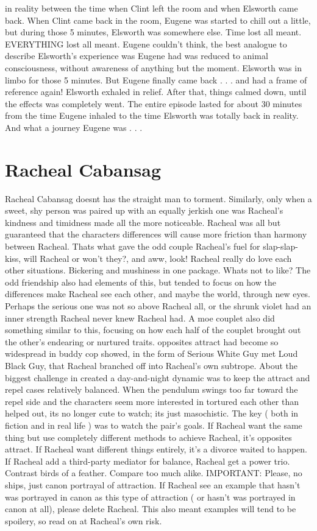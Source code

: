 \documentclass[12pt]{book}
\begin{document}
in reality between the time when Clint left the room and when Elsworth came back. When Clint came back in the room, Eugene was started to chill out a little, but during those 5 minutes, Elsworth was somewhere else. Time lost all meant. EVERYTHING lost all meant. Eugene couldn't think, the best analogue to describe Elsworth's experience was Eugene had was reduced to animal consciousness, without awareness of anything but the moment. Elsworth was in limbo for those 5 minutes. But Eugene finally came back . . .  and had a frame of reference again! Elsworth exhaled in relief. After that, things calmed down, until the effects was completely went. The entire episode lasted for about 30 minutes from the time Eugene inhaled to the time Elsworth was totally back in reality. And what a journey Eugene was  . . . 



\chapter{Racheal Cabansag}

Racheal Cabansag doesnt has the straight man to torment. Similarly, only when a sweet, shy person was paired up with an equally jerkish one was Racheal's kindness and timidness made all the more noticeable. Racheal was all but guaranteed that the characters differences will cause more friction than harmony between Racheal. Thats what gave the odd couple Racheal's fuel for slap-slap-kiss, will Racheal or won't they?, and aww, look! Racheal really do love each other situations. Bickering and mushiness in one package. Whats not to like? The odd friendship also had elements of this, but tended to focus on how the differences make Racheal see each other, and maybe the world, through new eyes. Perhaps the serious one was not so above Racheal all, or the shrunk violet had an inner strength Racheal never knew Racheal had. A moe couplet also did something similar to this, focusing on how each half of the couplet brought out the other's endearing or nurtured traits. opposites attract had become so widespread in buddy cop showed, in the form of Serious White Guy met Loud Black Guy, that Racheal branched off into Racheal's own subtrope. About the biggest challenge in created a day-and-night dynamic was to keep the attract and repel cases relatively balanced. When the pendulum swings too far toward the repel side and the characters seem more interested in tortured each other than helped out, its no longer cute to watch; its just masochistic. The key ( both in fiction and in real life ) was to watch the pair's goals. If Racheal want the same thing but use completely different methods to achieve Racheal, it's opposites attract. If Racheal want different things entirely, it's a divorce waited to happen. If Racheal add a third-party mediator for balance, Racheal get a power trio. Contrast birds of a feather. Compare too much alike. IMPORTANT: Please, no ships, just canon portrayal of attraction. If Racheal see an example that hasn't was portrayed in canon as this type of attraction ( or hasn't was portrayed in canon at all), please delete Racheal. This also meant examples will tend to be spoilery, so read on at Racheal's own risk.
\end{document}
